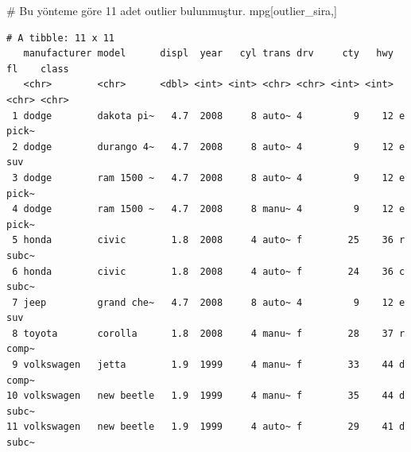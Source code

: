 \documentclass[
  letterpaper,
  DIV=11,
  numbers=noendperiod]{scrreprt}
\newenvironment{Shaded}{\begin{snugshade}}{\end{snugshade}}
\newcommand{\CommentTok}[1]{\textcolor[rgb]{0.37,0.37,0.37}{#1}}
\newcommand{\FloatTok}[1]{\textcolor[rgb]{0.68,0.00,0.00}{#1}}
\newcommand{\FunctionTok}[1]{\textcolor[rgb]{0.28,0.35,0.67}{#1}}
\newcommand{\NormalTok}[1]{\textcolor[rgb]{0.00,0.23,0.31}{#1}}
\newcommand{\OtherTok}[1]{\textcolor[rgb]{0.00,0.23,0.31}{#1}}
\newcommand{\SpecialCharTok}[1]{\textcolor[rgb]{0.37,0.37,0.37}{#1}}
\begin{document}
\begin{Shaded}
\begin{Highlighting}[]
\CommentTok{\# Bu yönteme göre 11 adet outlier bulunmuştur.}
\NormalTok{mpg[outlier\_sira,]}
\end{Highlighting}
\end{Shaded}

\begin{verbatim}
# A tibble: 11 x 11
   manufacturer model      displ  year   cyl trans drv     cty   hwy fl    class
   <chr>        <chr>      <dbl> <int> <int> <chr> <chr> <int> <int> <chr> <chr>
 1 dodge        dakota pi~   4.7  2008     8 auto~ 4         9    12 e     pick~
 2 dodge        durango 4~   4.7  2008     8 auto~ 4         9    12 e     suv  
 3 dodge        ram 1500 ~   4.7  2008     8 auto~ 4         9    12 e     pick~
 4 dodge        ram 1500 ~   4.7  2008     8 manu~ 4         9    12 e     pick~
 5 honda        civic        1.8  2008     4 auto~ f        25    36 r     subc~
 6 honda        civic        1.8  2008     4 auto~ f        24    36 c     subc~
 7 jeep         grand che~   4.7  2008     8 auto~ 4         9    12 e     suv  
 8 toyota       corolla      1.8  2008     4 manu~ f        28    37 r     comp~
 9 volkswagen   jetta        1.9  1999     4 manu~ f        33    44 d     comp~
10 volkswagen   new beetle   1.9  1999     4 manu~ f        35    44 d     subc~
11 volkswagen   new beetle   1.9  1999     4 auto~ f        29    41 d     subc~
\end{verbatim}

\begin{Shaded}
\end{Shaded}
\end{document}

